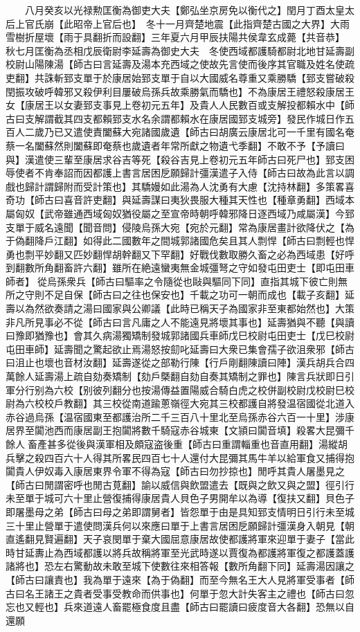 　　八月癸亥以光禄勲匡衡為御吏大夫【鄭弘坐京房免以衡代之】閏月丁酉太皇太后上官氏崩【此昭帝上官后也】　冬十一月齊楚地震【此指齊楚古國之大界】大雨雪樹折屋壞【雨于具翻折而設翻】三年夏六月甲辰扶陽共侯韋玄成薨【共音恭】　秋七月匡衡為丞相戊辰衛尉李延壽為御史大夫　冬使西域都護騎都尉北地甘延壽副校尉山陽陳湯【師古曰言延壽及湯本充西域之使故先言使而後序其官職及姓名使疏吏翻】共誅斬郅支單于於康居始郅支單于自以大國威名尊重又乘勝驕【郅支嘗破殺閏振攻破呼韓邪又殺伊利目屢破烏孫兵故乘勝氣而驕也】不為康居王禮怒殺康居王女【康居王以女妻郅支事見上卷初元五年】及貴人人民數百或支解投都賴水中【師古曰支解謂截其四支都賴郅支水名余謂都賴水在康居國郅支城旁】發民作城日作五百人二歲乃已又遣使責闔蘇大宛諸國歲遺【師古曰胡廣云康居北可一千里有國名奄蔡一名闔蘇然則闔蘇即奄蔡也歲遺者年常所獻之物遺弋季翻】不敢不予【予讀曰與】漢遣使三輩至康居求谷吉等死【殺谷吉見上卷初元五年師古曰死尸也】郅支困辱使者不肯奉詔而因都護上書言居困戹願歸計彊漢遣子入侍【師古曰故為此言以調戲也歸計謂歸附而受計策也】其驕嫚如此湯為人沈勇有大慮【沈持林翻】多策畧喜奇功【師古曰喜音許吏翻】與延壽謀曰夷狄畏服大種其天性也【種章勇翻】西域本屬匈奴【武帝雖通西域匈奴猶役屬之至宣帝時朝呼韓邪降日逐西域乃咸屬漢】今郅支單于威名遠聞【聞音問】侵陵烏孫大宛【宛於元翻】常為康居畫計欲降伏之【為于偽翻降戶江翻】如得此二國數年之間城郭諸國危矣且其人剽悍【師古曰剽輕也悍勇也剽平妙翻又匹妙翻悍胡幹翻又下罕翻】好戰伐數取勝久畜之必為西域患【好呼到翻數所角翻畜許六翻】雖所在絶遠蠻夷無金城彊弩之守如發屯田吏士【即屯田車師者】從烏孫衆兵【師古曰驅率之令隨從也敺與驅同下同】直指其城下彼亡則無所之守則不足自保【師古曰之往也保安也】千載之功可一朝而成也【載子亥翻】延壽以為然欲奏請之湯曰國家與公卿議【此時已稱天子為國家非至東都始然也】大策非凡所見事必不從【師古曰言凡庸之人不能遠見將壞其事也】延壽猶與不聽【與讀曰豫即猶豫也】會其久病湯獨矯制發城郭諸國兵車師戊巳校尉屯田吏士【戊巳校尉屯田車師】延壽聞之驚起欲止焉湯怒按劎叱延壽曰大衆已集會孺子欲沮衆邪【師古曰沮止也壞也音材汝翻】延壽遂從之部勒行陳【行戶剛翻陳讀曰陣】漢兵胡兵合四萬餘人延壽湯上疏自劾奏矯制【劾戶槩翻自劾自奏其矯制之罪也】陳言兵狀即日引軍分行别為六校【别彼列翻分也按湯傳益置陽威合騎白虎之校併副校尉戊校尉巳校尉為六校校戶教翻】其三校從南道踰蔥嶺徑大宛其三校都護自將發温宿國從北道入赤谷過烏孫【温宿國東至都護治所二千三百八十里北至烏孫赤谷六百一十里】涉康居界至闐池西而康居副王抱闐將數千騎寇赤谷城東【文頴曰闐音填】殺畧大昆彌千餘人畜產甚多從後與漢軍相及頗寇盗後重【師古曰重謂輜重也音直用翻】湯縱胡兵擊之殺四百六十人得其所畧民四百七十人還付大昆彌其馬牛羊以給軍食又捕得抱闐貴人伊奴毒入康居東界令軍不得為寇【師古曰勿抄掠也】閒呼其貴人屠墨見之【師古曰閒謂密呼也閒古莧翻】諭以威信與飲盟遣去【既與之飲又與之盟】徑引行未至單于城可六十里止營復捕得康居貴人貝色子男開牟以為導【復扶又翻】貝色子即屠墨母之弟【師古曰母之弟即謂舅者】皆怨單于由是具知郅支情明日引行未至城三十里止營單于遣使問漢兵何以來應曰單于上書言居困戹願歸計彊漢身入朝見【朝直遙翻見賢遍翻】天子哀閔單于棄大國屈意康居故使都護將軍來迎單于妻子【當此時甘延夀止為西域都護以將兵故稱將軍至光武時遂以賈復為都護將軍復之都護蓋護諸將也】恐左右驚動故未敢至城下使數往來相答報【數所角翻下同】延壽湯因讓之【師古曰讓責也】我為單于遠來【為于偽翻】而至今無名王大人見將軍受事者【師古曰名王諸王之貴者受事受教命而供事也】何單于忽大計失客主之禮也【師古曰忽忘也又輕也】兵來道遠人畜罷極食度且盡【師古曰罷讀曰疲度音大各翻】恐無以自還願